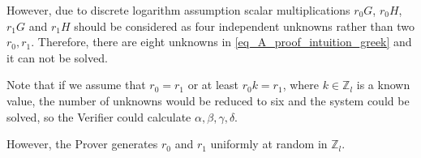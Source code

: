 \documentclass{article}
\numberwithin{figure}{section}
\begin{document}
However, due to discrete logarithm assumption scalar multiplications $r_0 G$, $r_0 H$, $r_1 G$ and $r_1 H$ should be considered as four independent unknowns rather than two $r_0, r_1$. Therefore, there are eight unknowns in \eqref{eq_A_proof_intuition_greek} and it can not be solved.

Note that if we assume that $r_0 = r_1$ or at least $r_0 k = r_1$, where $k \in \mathbb{Z}_l$ is a known value, the number of unknowns would be reduced to six and the system could be solved, so the Verifier could calculate $\alpha, \beta, \gamma, \delta$.

However, the Prover generates $r_0$ and $r_1$ uniformly at random in $\mathbb{Z}_l$.
\end{document}
